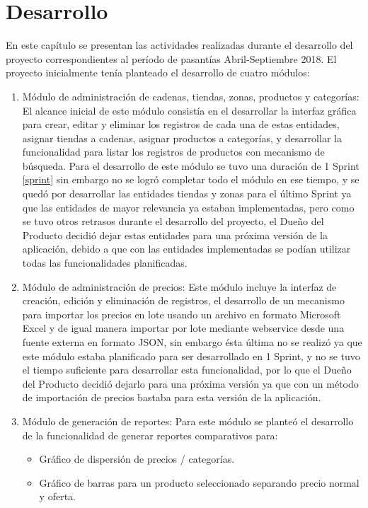 \chapter{Desarrollo} \label{development}
En este capítulo se presentan las actividades realizadas durante el desarrollo del proyecto correspondientes al período de pasantías Abril-Septiembre 2018. El proyecto inicialmente tenía planteado el desarrollo de cuatro módulos:
\begin{enumerate}
	\item Módulo de administración de cadenas, tiendas, zonas, productos y categorías: El alcance inicial de este módulo consistía en el desarrollar la interfaz gráfica para crear, editar y eliminar los registros de cada una de estas entidades, asignar tiendas a cadenas, asignar productos a categorías, y desarrollar la funcionalidad para listar los registros de productos con mecanismo de búsqueda. Para el desarrollo de este módulo se tuvo una duración de 1 Sprint \ref{sprint} sin embargo no se logró completar todo el módulo en ese tiempo, y se quedó por desarrollar las entidades tiendas y zonas para el último Sprint ya que las entidades de mayor relevancia ya estaban implementadas, pero como se tuvo otros retrasos durante el desarrollo del proyecto, el Dueño del Producto decidió dejar estas entidades para una próxima versión de la aplicación, debido a que con las entidades implementadas se podían utilizar todas las funcionalidades planificadas.
    \item Módulo de administración de precios: Este módulo incluye la interfaz de creación, edición y eliminación de registros, el desarrollo de un mecanismo para importar los precios en lote usando un archivo en formato Microsoft Excel y de igual manera importar por lote mediante webservice desde una fuente externa en formato JSON, sin embargo ésta última no se realizó ya que este módulo estaba planificado para ser desarrollado en 1 Sprint, y no se tuvo el tiempo suficiente para desarrollar esta funcionalidad, por lo que el Dueño del Producto decidió dejarlo para una próxima versión ya que con un método de importación de precios bastaba para esta versión de la aplicación.
	\item Módulo de generación de reportes: Para este módulo se planteó el desarrollo de la funcionalidad de generar reportes comparativos para: 
    \begin{itemize}
        \item Gráfico de dispersión de precios / categorías.
        \item Gráfico de barras para un producto seleccionado separando precio normal y oferta.

\end{itemize}
\end{enumerate}
